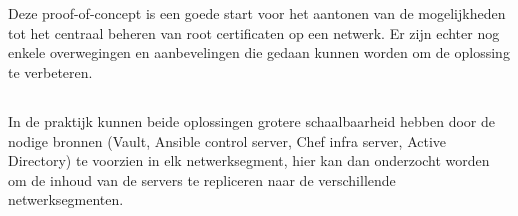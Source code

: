 \section{}%
\label{sec:Overwegingen_en_aanbevelingen}
    Deze proof-of-concept is een goede start voor het aantonen van de mogelijkheden tot het centraal beheren van root certificaten op een netwerk. Er zijn echter nog enkele overwegingen en aanbevelingen die gedaan kunnen worden om de oplossing te verbeteren.
\subsection{}
\label{subsec:Schaalbaarheid}
    In de praktijk kunnen beide oplossingen grotere schaalbaarheid hebben door de nodige bronnen (Vault, Ansible control server, Chef infra server, Active Directory) te voorzien in elk netwerksegment, hier kan dan onderzocht worden om de inhoud van de servers te repliceren naar de verschillende netwerksegmenten.